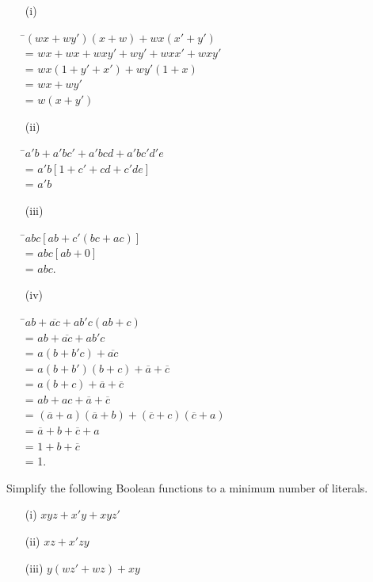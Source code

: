 \begin{solution}
\begin{itemize}
\item[(i)]
\begin{tabbing}
\phantom{AAAAAA} \=\quad $(wx+wy')(x+w)+wx(x'+y')$\\[3pt]
\>= $wx+wx+wxy'+wy'+wxx'+wxy'$\\[3pt]
\>= $wx(1+y'+x')+wy'(1+x)$\\[3pt]
\>= $wx+wy'$\\[3pt]
\>= $w(x+y')$
\end{tabbing}

\item[(ii)]
\begin{tabbing}
 \=\quad $a'b+a'bc'+a'bcd+a'bc'd'e$\\[3pt]
\>= $a'b[1+c'+cd+c'de]$\\[3pt]
\>= $a'b$
\end{tabbing}

\item[(iii)]
\begin{tabbing}
 \=\quad $abc[ab+c'(bc+ac)]$\\[3pt]
\>= $abc[ab+0]$\\[3pt]
\>= $abc$.
\end{tabbing}

\item[(iv)]
\begin{tabbing}
 \=\quad $ab+\overline{ac}+ab'c(ab+c)$\\[3pt]
\>= $ab+\overline{ac}+ab'c$\\[3pt]
\>= $a(b+b'c)+\overline{ac}$\\[3pt]
\>= $a(b+b')(b+c)+\overline{a}+\overline{c}$\\[3pt]
\>= $a(b+c)+\overline{a}+\overline{c}$\\[3pt]
\>= $ab+ac+\overline{a}+\overline{c}$\\[3pt]
\>= $(\overline{a}+a)(\overline{a}+b)+(\overline{c}+c)(\overline{c}+a)$\\[3pt]
\>= $\overline{a}+b+\overline{c}+a$\\[3pt]
\>= $1+b+\overline{c}$\\[3pt]
\>= 1.
\end{tabbing}
\end{itemize}
\end{solution}

\begin{problem}\label{prob5.60}
Simplify the following Boolean functions to a minimum number of literals.
\begin{itemize}
\item[(i)] $xyz+x'y+xyz'$

\item[(ii)] $xz+x'zy$

\item[(iii)] $y(wz'+wz)+xy$
\end{itemize}
\end{problem}

